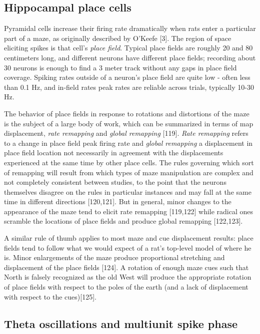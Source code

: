 \documentclass[]{article}
\begin{document}
\subsection{Hippocampal place cells}

Pyramidal cells increase their firing rate dramatically when rats enter
a particular part of a maze, as originally described by O'Keefe {[}3{]}.
The region of space eliciting spikes is that cell's \emph{place field}.
Typical place fields are roughly 20 and 80 centimeters long, and
different neurons have different place fields; recording about 30
neurons is enough to find a 3 meter track without any gaps in place
field coverage. Spiking rates outside of a neuron's place field are
quite low - often less than 0.1 Hz, and in-field rates peak rates are
reliable across trials, typically 10-30 Hz.

The behavior of place fields in response to rotations and distortions of
the maze is the subject of a large body of work, which can be summarized
in terms of map displacement, \emph{rate remapping} and \emph{global
remapping} {[}119{]}. \emph{Rate remapping} refers to a change in place
field peak firing rate and \emph{global remapping} a displacement in
place field location not necessarily in agreement with the displacements
experienced at the same time by other place cells. The rules governing
which sort of remapping will result from which types of maze
manipulation are complex and not completely consistent between studies,
to the point that the neurons themselves disagree on the rules in
particular instances and may fall at the same time in different
directions {[}120,121{]}. But in general, minor changes to the
appearance of the maze tend to elicit rate remapping {[}119,122{]} while
radical ones scramble the locations of place fields and produce global
remapping {[}122,123{]}.

A similar rule of thumb applies to most maze and cue displacement
results: place fields tend to follow what we would expect of a rat's
top-level model of where he is. Minor enlargements of the maze produce
proportional stretching and displacement of the place fields {[}124{]}.
A rotation of enough maze cues such that North is falsely recognized as
the old West will produce the appropriate rotation of place fields with
respect to the poles of the earth (and a lack of displacement with
respect to the cues){[}125{]}.

\subsection{Theta oscillations and multiunit spike phase}
\end{document}
